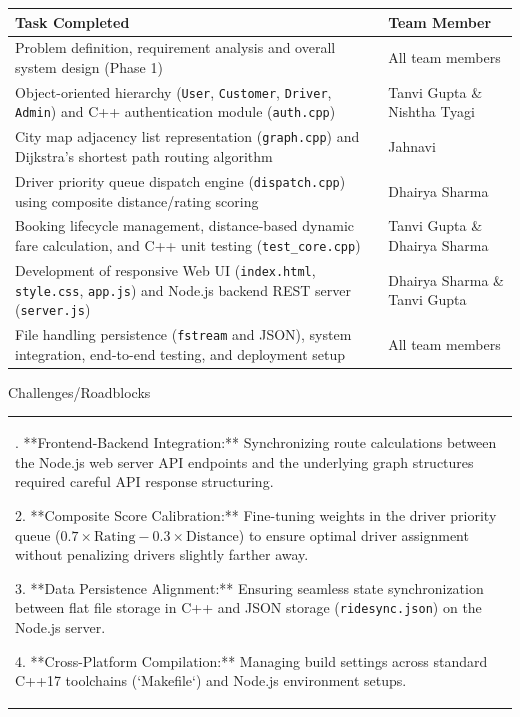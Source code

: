 \documentclass[12pt,a4paper]{article}
\newcommand{\sectiontitle}[1]{%
    {\color{GEUBlue}
    \fontsize{18}{22}\selectfont #1}
}
\newcommand{\answerbox}[2]{%
    \begin{tabularx}{\textwidth}{
        |>{\RaggedRight\arraybackslash}X|}
        \hline
        \parbox[t][#1][t]{\dimexpr\linewidth-12pt\relax}{
            \vspace{5pt}
            \fontsize{11}{13}\selectfont #2
        }\\
        \hline
    \end{tabularx}
}
\begin{document}
\begin{tabularx}{\textwidth}{
|>{\RaggedRight\arraybackslash}X
|>{\RaggedRight\arraybackslash}p{}|
}
\hline

\textbf{Task Completed} &
\textbf{Team Member}\\
\hline

Problem definition, requirement analysis and overall system design (Phase 1) &
All team members \\
\hline

Object-oriented hierarchy (\texttt{User}, \texttt{Customer}, \texttt{Driver}, \texttt{Admin}) and C++ authentication module (\texttt{auth.cpp}) &
Tanvi Gupta \& Nishtha Tyagi \\
\hline

City map adjacency list representation (\texttt{graph.cpp}) and Dijkstra's shortest path routing algorithm &
Jahnavi \\
\hline

Driver priority queue dispatch engine (\texttt{dispatch.cpp}) using composite distance/rating scoring &
Dhairya Sharma \\
\hline

Booking lifecycle management, distance-based dynamic fare calculation, and C++ unit testing (\texttt{test\_core.cpp}) &
Tanvi Gupta \& Dhairya Sharma \\
\hline

Development of responsive Web UI (\texttt{index.html}, \texttt{style.css}, \texttt{app.js}) and Node.js backend REST server (\texttt{server.js}) &
Dhairya Sharma \& Tanvi Gupta \\
\hline

File handling persistence (\texttt{fstream} and JSON), system integration, end-to-end testing, and deployment setup &
All team members \\
\hline

\end{tabularx}

\vspace{0.65cm}

\sectiontitle{Challenges/Roadblocks}

\vspace{0.05cm}

\vspace{0.18cm}

\answerbox{5.30cm}{
1. **Frontend-Backend Integration:** Synchronizing route calculations between the Node.js web server API endpoints and the underlying graph structures required careful API response structuring.

2. **Composite Score Calibration:** Fine-tuning weights in the driver priority queue ($0.7 \times \text{Rating} - 0.3 \times \text{Distance}$) to ensure optimal driver assignment without penalizing drivers slightly farther away.

3. **Data Persistence Alignment:** Ensuring seamless state synchronization between flat file storage in C++ and JSON storage (\texttt{ridesync.json}) on the Node.js server.

4. **Cross-Platform Compilation:** Managing build settings across standard C++17 toolchains (`Makefile`) and Node.js environment setups.
}
\end{document}
